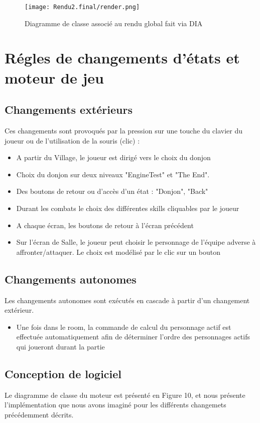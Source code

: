 \documentclass[a4paper,12pt]{article}
\begin{document}
\begin{figure}[!ht]
  \centering
  \texttt{[image: Rendu2.final/render.png]}
  \caption{Diagramme de classe associé au rendu global fait via DIA}
\end{figure}
\clearpage
\newpage 
\section{Régles de changements d'états et moteur de jeu}
\subsection{Changements extérieurs}
Ces changements sont provoqués par la pression sur une touche du clavier du joueur ou de l'utilisation de la souris (clic) : 
\begin{itemize}
    \item A partir du Village, le joueur est dirigé vers le choix du donjon
    \item Choix du donjon sur deux niveaux "EngineTest" et "The End".
    \item Des boutons de retour ou d'accès d'un état : "Donjon", "Back"
    \item Durant les combats le choix des différentes skills cliquables par le joueur
    \item A chaque écran, les boutons de retour à l'écran précédent
    \item Sur l'écran de Salle, le joueur peut choisir le personnage de l'équipe adverse à affronter/attaquer. Le choix est modélisé par le clic sur un bouton
\end{itemize}

\subsection{Changements autonomes}
Les changements autonomes sont exécutés en cascade à partir d'un changement extérieur. 
\begin{itemize}
    \item Une fois dans le room, la commande de calcul du personnage actif est effectuée automatiquement afin de déterminer l'ordre des personnages actifs qui joueront durant la partie
\end{itemize}

\subsection{Conception de logiciel}
Le diagramme de classe du moteur est présenté en Figure 10, et nous présente l'implémentation que nous avons imaginé pour les différents changemets précédemment décrits.
\end{document}
